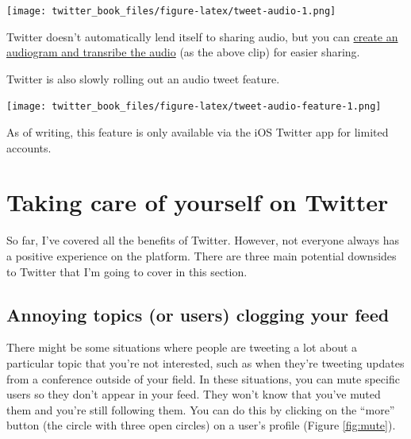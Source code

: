 \documentclass[
]{book}
\begin{document}
\texttt{[image: twitter\_book\_files/figure-latex/tweet-audio-1.png]}

Twitter doesn't automatically lend itself to sharing audio, but you can \href{https://www.dsquintana.blog/podcast-guide/}{create an audiogram and transribe the audio} (as the above clip) for easier sharing.

Twitter is also slowly rolling out an audio tweet feature.

\texttt{[image: twitter\_book\_files/figure-latex/tweet-audio-feature-1.png]}

As of writing, this feature is only available via the iOS Twitter app for limited accounts.

\hypertarget{care}{%
\chapter{Taking care of yourself on Twitter}\label{care}}

So far, I've covered all the benefits of Twitter. However, not everyone always has a positive experience on the platform. There are three main potential downsides to Twitter that I'm going to cover in this section.

\hypertarget{annoying-topics-or-users-clogging-your-feed}{%
\section*{Annoying topics (or users) clogging your feed}\label{annoying-topics-or-users-clogging-your-feed}}

There might be some situations where people are tweeting a lot about a particular topic that you're not interested, such as when they're tweeting updates from a conference outside of your field. In these situations, you can mute specific users so they don't appear in your feed. They won't know that you've muted them and you're still following them. You can do this by clicking on the ``more'' button (the circle with three open circles) on a user's profile (Figure \ref{fig:mute}).
\end{document}
